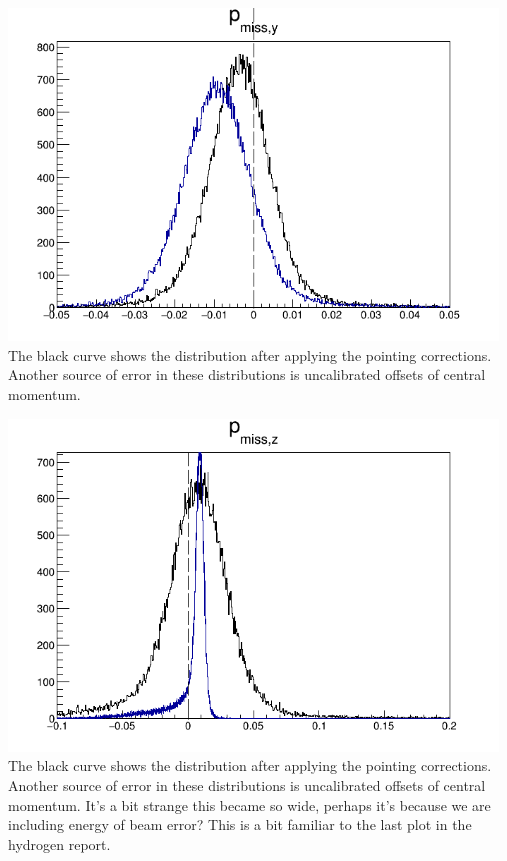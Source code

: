 \documentclass{article}
\begin{document}
\begin{center}
\includegraphics[width=13cm]{../report-H/delPmy.png}\\
The black curve shows the distribution after applying the pointing corrections. Another source of error in these distributions is uncalibrated offsets of central momentum.
\end{center}


\begin{center}
\includegraphics[width=13cm]{../report-H/delPmz.png}\\
The black curve shows the distribution after applying the pointing corrections. Another source of error in these distributions is uncalibrated offsets of central momentum. It's a bit strange this became so wide, perhaps it's because we are including energy of beam error? This is a bit familiar to the last plot in the hydrogen report.
\end{center}
\end{document}
